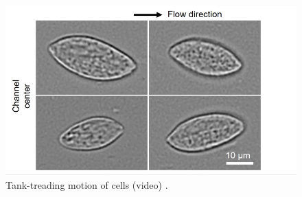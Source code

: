 \documentclass{beamer}
\begin{document}
\begin{frame}
\begin{overlayarea}{\textwidth}{\textheight}
\begin{figure}
\begin{minipage}{0.35\linewidth}
	\includegraphics[width=\linewidth]{plots/application5.png}
	\centering \scriptsize Tank-treading motion of cells (video) \cite{gerum2022viscoelastic}.
\end{minipage}
		\end{figure}
	\end{overlayarea}
\end{frame}

\end{document}
